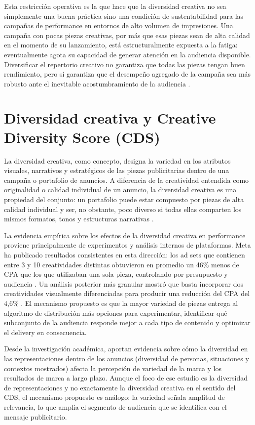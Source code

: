 \documentclass[12pt, a4paper]{report}
\begin{document}
Esta restricción operativa es la que hace que la diversidad creativa no sea simplemente una buena
práctica sino una condición de sustentabilidad para las campañas de performance en entornos de alto
volumen de impresiones. Una campaña con pocas piezas creativas, por más que esas piezas sean de alta
calidad en el momento de su lanzamiento, está estructuralmente expuesta a la fatiga: eventualmente
agota su capacidad de generar atención en la audiencia disponible. Diversificar el repertorio creativo
no garantiza que todas las piezas tengan buen rendimiento, pero sí garantiza que el desempeño agregado
de la campaña sea más robusto ante el inevitable acostumbramiento de la audiencia \citep{singular2025}.

\section{Diversidad creativa y Creative Diversity Score (CDS)}

La diversidad creativa, como concepto, designa la variedad en los atributos visuales, narrativos y
estratégicos de las piezas publicitarias dentro de una campaña o portafolio de anuncios. A diferencia de la
creatividad entendida como originalidad o calidad individual de un anuncio, la diversidad creativa
es una propiedad del conjunto: un portafolio puede estar compuesto por piezas de alta calidad
individual y ser, no obstante, poco diverso si todas ellas comparten los mismos formatos, tonos y
estructuras narrativas \citep{jcr_diversity2024}.

La evidencia empírica sobre los efectos de la diversidad creativa en performance proviene principalmente
de experimentos y análisis internos de plataformas. Meta ha publicado resultados consistentes en esta
dirección: los ad sets que contienen entre 3 y 10 creatividades distintas obtuvieron en promedio un
46\% menos de CPA que los que utilizaban una sola pieza, controlando por presupuesto y audiencia
\citep{meta2024a}. Un análisis posterior más granular mostró que basta incorporar dos creatividades
visualmente diferenciadas para producir una reducción del CPA del 4,6\% \citep{meta2024b}. El
mecanismo propuesto es que la mayor variedad de piezas entrega al algoritmo de distribución más
opciones para experimentar, identificar qué subconjunto de la audiencia responde mejor a cada tipo
de contenido y optimizar el delivery en consecuencia.

Desde la investigación académica, \citet{jcr_diversity2024} aportan evidencia sobre cómo la diversidad
en las representaciones dentro de los anuncios (diversidad de personas, situaciones y contextos
mostrados) afecta la percepción de variedad de la marca y los resultados de marca a largo plazo.
Aunque el foco de ese estudio es la diversidad de representaciones y no exactamente la diversidad
creativa en el sentido del CDS, el mecanismo propuesto es análogo: la variedad señala amplitud de
relevancia, lo que amplía el segmento de audiencia que se identifica con el mensaje publicitario.
\end{document}

